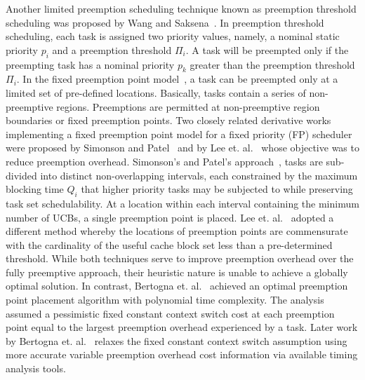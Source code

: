 Another limited preemption scheduling technique known as preemption threshold scheduling was proposed by Wang and Saksena~\cite{wang:99}.  In preemption threshold scheduling, each task is assigned two priority values, namely, a nominal static priority \begin{math}p_{i}\end{math} and a preemption threshold \begin{math}\Pi_{i}\end{math}.  A task will be preempted only if the preempting task has a nominal priority \begin{math}p_{k}\end{math} greater than the preemption threshold \begin{math}\Pi_{i}\end{math}. In the fixed preemption point model~\cite{burns:05}, a task can be preempted only at a limited set of pre-defined locations. Basically, tasks contain a series of non-preemptive regions.  Preemptions are permitted at non-preemptive region boundaries or fixed preemption points.
\newline
\indent
Two closely related derivative works implementing a fixed preemption point model for a fixed priority (FP) scheduler were proposed by Simonson and Patel~\cite{simonson:95} and by Lee et. al.~\cite{lee:98} whose objective was to reduce preemption overhead.  Simonson’s and Patel’s approach~\cite{simonson:95}, tasks are sub-divided into distinct non-overlapping intervals, each constrained by the maximum blocking time \begin{math}Q_{i}\end{math} that higher priority tasks may be subjected to while preserving task set schedulability.  At a location within each interval containing the minimum number of UCBs, a single preemption point is placed.  Lee et. al.~\cite{lee:98} adopted a different method whereby the locations of preemption points are commensurate with the cardinality of the useful cache block set less than a pre-determined threshold.   While both techniques serve to improve preemption overhead over the fully preemptive approach, their heuristic nature is unable to achieve a globally optimal solution.
\newline
\indent
In contrast, Bertogna et. al.~\cite{bertogna:10} achieved an optimal preemption point placement algorithm with polynomial time complexity.  The analysis assumed a pessimistic fixed constant context switch cost at each preemption point equal to the largest preemption overhead experienced by a task.  Later work by Bertogna et. al.~\cite{bertogna:11} relaxes the fixed constant context switch assumption using more accurate variable preemption overhead cost information via available timing analysis tools.
